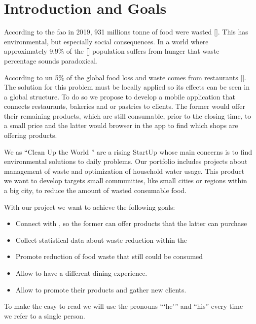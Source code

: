 \section{Introduction and Goals}

According to the \acrfull{fao} in 2019, 931 millions tonne of food were wasted [\cite{refart:FAOFW}]. This has
environmental, but especially social consequences. In a world where approximately 9.9\% of the [\cite{refart:AAHWH}]
population suffers from hunger that waste percentage sounds paradoxical.

According to \acrfull{un} 5\% of the global food loss and waste comes from restaurants [\cite{refart:UNSP}]. 
The solution for this problem must be locally applied so its effects can be seen in a global structure. To do 
so we propose to develop a mobile application that connects restaurants, bakeries and or pastries to clients. The
former would offer their remaining products, which are still consumable, prior to the closing time, to a small price
and the latter would browser in the app to find which shops are offering products. 

We as ``Clean Up the World \textregistered'' are a rising StartUp whose main concerns is to find environmental solutions to
daily problems. Our portfolio includes projects about management of waste and optimization of household water 
usage. This product we want to develop targets small communities, like small cities or regions within a big city, 
to reduce the amount of wasted consumable food.

With our project we want to achieve the following goals:

\begin{itemize}
    \item Connect  with , so the former can offer products that the latter
    can purchase
    \item Collect statistical data about waste reduction within the 
    \item Promote reduction of food waste that still could be consumed
    \item Allow  to have a different dining experience.
    \item Allow  to promote their products and gather new clients.
\end{itemize}

To make the easy to read we will use the pronouns ```he''' and ``his'' every time we refer to a single person.

